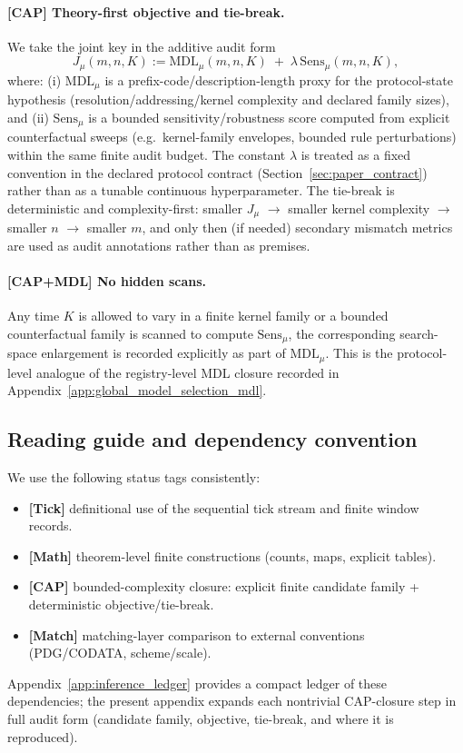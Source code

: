 \paragraph{[CAP] Theory-first objective and tie-break.}
We take the joint key in the additive audit form
\[
J_\mu(m,n,K):=\mathrm{MDL}_\mu(m,n,K)\;+\;\lambda\,\mathrm{Sens}_\mu(m,n,K),
\]
where:
(i) $\mathrm{MDL}_\mu$ is a prefix-code/description-length proxy for the protocol-state hypothesis (resolution/addressing/kernel complexity and declared family sizes), and
(ii) $\mathrm{Sens}_\mu$ is a bounded sensitivity/robustness score computed from explicit counterfactual sweeps (e.g.\ kernel-family envelopes, bounded rule perturbations) within the same finite audit budget.
The constant $\lambda$ is treated as a fixed convention in the declared protocol contract (Section~\ref{sec:paper_contract}) rather than as a tunable continuous hyperparameter.
The tie-break is deterministic and complexity-first:
smaller $J_\mu$ $\to$ smaller kernel complexity $\to$ smaller $n$ $\to$ smaller $m$,
and only then (if needed) secondary mismatch metrics are used as audit annotations rather than as premises.

\paragraph{[CAP+MDL] No hidden scans.}
Any time $K$ is allowed to vary in a finite kernel family or a bounded counterfactual family is scanned to compute $\mathrm{Sens}_\mu$, the corresponding search-space enlargement is recorded explicitly as part of $\mathrm{MDL}_\mu$.
This is the protocol-level analogue of the registry-level MDL closure recorded in Appendix~\ref{app:global_model_selection_mdl}.

\subsection{Reading guide and dependency convention}
\label{subsec:tick_cap_derivation_reading_guide}

We use the following status tags consistently:
\begin{itemize}
\item \textbf{[Tick]} definitional use of the sequential tick stream and finite window records.
\item \textbf{[Math]} theorem-level finite constructions (counts, maps, explicit tables).
\item \textbf{[CAP]} bounded-complexity closure: explicit finite candidate family + deterministic objective/tie-break.
\item \textbf{[Match]} matching-layer comparison to external conventions (PDG/CODATA, scheme/scale).
\end{itemize}
Appendix~\ref{app:inference_ledger} provides a compact ledger of these dependencies; the present appendix expands each nontrivial CAP-closure step in full audit form (candidate family, objective, tie-break, and where it is reproduced).

